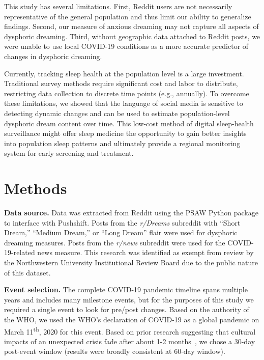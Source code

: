 \documentclass[11pt,a4paper,twocolumn]{article}
\begin{document}
\par
This study has several limitations. First, Reddit users are not necessarily representative of the general population and thus limit our ability to generalize findings. Second, our measure of anxious dreaming may not capture all aspects of dysphoric dreaming. Third, without geographic data attached to Reddit posts, we were unable to use local COVID-19 conditions as a more accurate predictor of changes in dysphoric dreaming.

\par
Currently, tracking sleep health at the population level is a large investment. Traditional survey methods require significant cost and labor to distribute, restricting data collection to discrete time points (e.g., annually). To overcome these limitations, we showed that the language of social media is sensitive to detecting dynamic changes and can be used to estimate population-level dysphoric dream content over time. This low-cost method of digital sleep-health surveillance might offer sleep medicine the opportunity to gain better insights into population sleep patterns and ultimately provide a regional monitoring system for early screening and treatment.

\section*{Methods}

\textbf{Data source.} Data was extracted from Reddit using the PSAW Python package to interface with Pushshift. Posts from the \textit{r/Dreams} subreddit with ``Short Dream,'' ``Medium Dream,'' or ``Long Dream'' flair were used for dysphoric dreaming measures. Posts from the \textit{r/news} subreddit were used for the COVID-19-related news measure. This research was identified as exempt from review by the Northwestern University Institutional Review Board due to the public nature of this dataset.

\bigskip
\noindent
\textbf{Event selection.} The complete COVID-19 pandemic timeline spans multiple years and includes many milestone events, but for the purposes of this study we required a single event to look for pre/post changes. Based on the authority of the WHO, we used the WHO's declaration of COVID-19 as a global pandemic on March 11\textsuperscript{th}, 2020 for this event. Based on prior research suggesting that cultural impacts of an unexpected crisis fade after about 1-2 months~\supercite{pennebaker1993individuals}, we chose a 30-day post-event window (results were broadly consistent at 60-day window).
\end{document}
